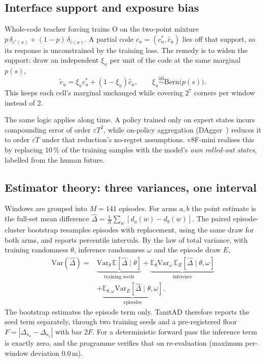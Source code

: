 \documentclass[10pt,twocolumn]{article}
\theoremstyle{remark}
\begin{document}
\subsection{Interface support and exposure bias}
Whole-code teacher forcing trains O on the two-point mixture $p\,\delta_{c^\ast(x)}+(1-p)\,\delta_{\hat c(x)}$. A partial code
$c_u=(c^\ast_u,\hat c_{\bar u})$ lies off that support, so its response is unconstrained by the training loss. The remedy is to widen
the support: draw an independent $\xi_u$ per unit of the code at the same marginal $p(s)$,
\begin{equation}
\tilde c_u=\xi_u c^\ast_u+(1-\xi_u)\hat c_u,\qquad \xi_u\stackrel{\mathrm{iid}}{\sim}\mathrm{Bern}\big(p(s)\big).
\end{equation}
This keeps each cell's marginal unchanged while covering $2^7$ corners per window instead of 2.

The same logic applies along time. A policy trained only on expert states incurs compounding error of order $\varepsilon T^2$, while
on-policy aggregation (DAgger~\cite{dagger}) reduces it to order $\varepsilon T$ under that reduction's no-regret assumptions. v8F-mini realises this by replacing 10\,\% of the
training samples with the model's \emph{own rolled-out states}, labelled from the human future.

\subsection{Estimator theory: three variances, one interval}
Windows are grouped into $M=141$ episodes. For arms $a,b$ the point estimate is the full-set mean difference
$\hat\Delta=\frac1N\sum_w[d_a(w)-d_b(w)]$. The paired episode-cluster bootstrap resamples episodes with replacement, using the same
draw for both arms, and reports percentile intervals. By the law of total variance, with training randomness $\theta$, inference
randomness $\omega$ and the episode draw $E$,
\begin{equation}
\begin{aligned}
\mathrm{Var}(\hat\Delta)={}&\underbrace{\mathrm{Var}_\theta\,\mathbb E[\hat\Delta\mid\theta]}_{\text{training seeds}}+\underbrace{\mathbb E_\theta\mathrm{Var}_\omega\,\mathbb E_E[\hat\Delta\mid\theta,\omega]}_{\text{inference}}\\
&+\underbrace{\mathbb E_{\theta,\omega}\mathrm{Var}_E[\hat\Delta\mid\theta,\omega]}_{\text{episodes}} .
\end{aligned}
\end{equation}
The bootstrap estimates the episode term only. TanitAD therefore reports the seed term separately, through two training seeds and a
pre-registered floor $F=|\Delta_{s_0}-\Delta_{s_1}|$ with bar $2F$. For a deterministic forward pass the inference term is exactly zero,
and the programme verifies that on re-evaluation (maximum per-window deviation 0.0\,m).
\end{document}
